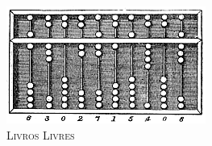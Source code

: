 
\thispagestyle{empty}

\begin{flushleft}
	\vspace*{2cm}
	\Huge\textbf{\titulo}
\end{flushleft}

\cleardoublepage

\thispagestyle{empty}

\begin{flushleft}
	\Large \autor
	\vspace{2cm}\\
	\Huge\textbf{\titulo}
	\vspace{0.5cm}\\
	\Large\subtitulo
\end{flushleft}

	\vfill

\begin{figure}[!h]
	\centering
	\includegraphics[scale=0.5]{./imagens/abacus}
	\caption*{\scshape Livros Livres}
\end{figure}

\clearpage

\restoregeometry